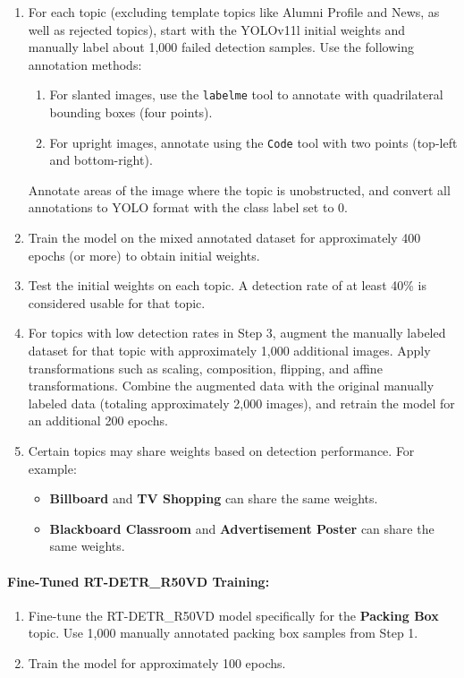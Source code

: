 \begin{enumerate}
    \item For each topic (excluding template topics like Alumni Profile and News, as well as rejected topics), start with the YOLOv11l initial weights and manually label about 1,000 failed detection samples. Use the following annotation methods:
    \begin{enumerate}
        \item For slanted images, use the \texttt{labelme} tool to annotate with quadrilateral bounding boxes (four points).
        \item For upright images, annotate using the \texttt{Code} tool with two points (top-left and bottom-right).
    \end{enumerate}
    Annotate areas of the image where the topic is unobstructed, and convert all annotations to YOLO format with the class label set to 0.
    \item Train the model on the mixed annotated dataset for approximately 400 epochs (or more) to obtain initial weights.
    \item Test the initial weights on each topic. A detection rate of at least 40\% is considered usable for that topic.
    \item For topics with low detection rates in Step 3, augment the manually labeled dataset for that topic with approximately 1,000 additional images. Apply transformations such as scaling, composition, flipping, and affine transformations. Combine the augmented data with the original manually labeled data (totaling approximately 2,000 images), and retrain the model for an additional 200 epochs.
    \item Certain topics may share weights based on detection performance. For example:
    \begin{itemize}
        \item \textbf{Billboard} and \textbf{TV Shopping} can share the same weights.
        \item \textbf{Blackboard Classroom} and \textbf{Advertisement Poster} can share the same weights.
    \end{itemize}
\end{enumerate}

\paragraph{Fine-Tuned RT-DETR\_R50VD Training:}

\begin{enumerate}
    \item Fine-tune the RT-DETR\_R50VD model specifically for the \textbf{Packing Box} topic. Use 1,000 manually annotated packing box samples from Step 1.
    \item Train the model  for approximately 100 epochs.
\end{enumerate}




